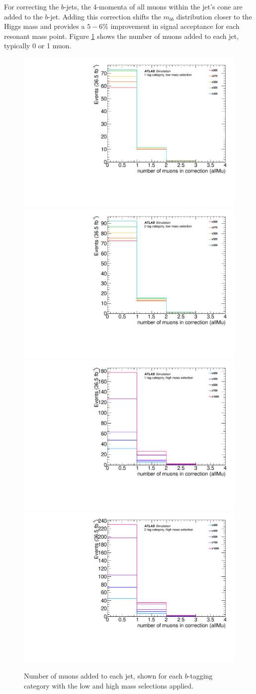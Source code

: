 For correcting the $b$-jets, the 4-momenta of all muons within the jet's \Dr cone are added to the $b$-jet. Adding this correction shifts the $m_{bb}$ distribution closer to the Higgs mass and provides a $5-6\%$ improvement in signal acceptance for each resonant mass point. Figure \ref{fig:n_muons} shows the number of muons added to each jet, typically 0 or 1 muon.

\begin{figure}[!ht]
  \centering
  \includegraphics[height=0.32\textwidth]{chapters/chapter5_yybb/images/muon-in-jet/all_mu_n_allMu_low_1.pdf}
  \includegraphics[height=0.32\textwidth]{chapters/chapter5_yybb/images/muon-in-jet/all_mu_n_allMu_low_2.pdf} \\
  \includegraphics[height=0.32\textwidth]{chapters/chapter5_yybb/images/muon-in-jet/all_mu_n_allMu_high_1.pdf}
  \includegraphics[height=0.32\textwidth]{chapters/chapter5_yybb/images/muon-in-jet/all_mu_n_allMu_high_2.pdf} \\
  \caption[Number of muons added to each jet, shown for each $b$-tagging category with the low and high mass  selections applied]{Number of muons added to each jet, shown for each $b$-tagging category with the low and high mass  selections applied.}
  \label{fig:n_muons}
\end{figure}


